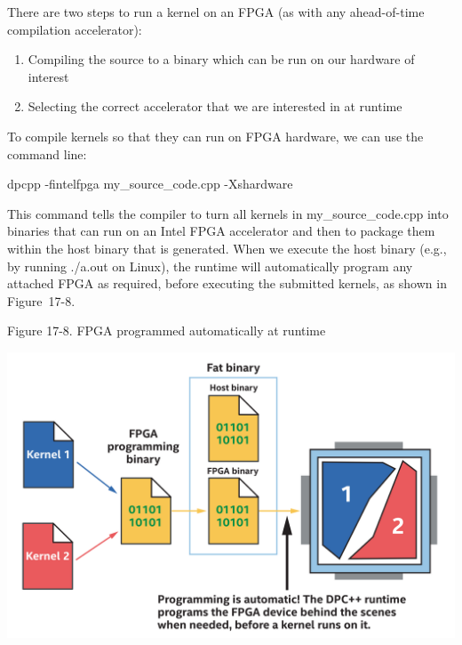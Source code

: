 There are two steps to run a kernel on an FPGA (as with any ahead-of-time compilation accelerator):\par

\begin{enumerate}
	\item Compiling the source to a binary which can be run on our hardware of interest
	\item Selecting the correct accelerator that we are interested in at runtime
\end{enumerate}

To compile kernels so that they can run on FPGA hardware, we can use the command line:\par

\begin{tcolorbox}[colback=white,colframe=black]
dpcpp -fintelfpga my\_source\_code.cpp -Xshardware
\end{tcolorbox}

This command tells the compiler to turn all kernels in my\_source\_code.cpp into binaries that can run on an Intel FPGA accelerator and then to package them within the host binary that is generated. When we execute the host binary (e.g., by running ./a.out on Linux), the runtime will automatically program any attached FPGA as required, before executing the submitted kernels, as shown in Figure 17-8.\par

\hspace*{\fill} \par %
Figure 17-8. FPGA programmed automatically at runtime
\begin{center}
	\includegraphics[width=1.0\textwidth]{content/chapter-17/images/9}
\end{center}

